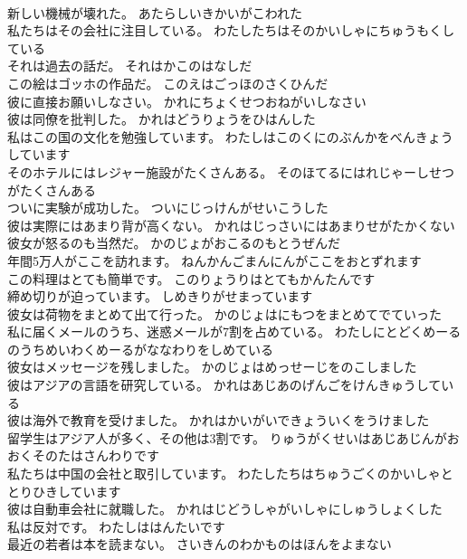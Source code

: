 \documentclass[8pt]{extreport}
\begin{document}
\begin{CJK}{UTF8}{min}
\\	新しい機械が壊れた。	あたらしいきかいがこわれた 
\\	私たちはその会社に注目している。	わたしたちはそのかいしゃにちゅうもくしている 
\\	それは過去の話だ。	それはかこのはなしだ 
\\	この絵はゴッホの作品だ。	このえはごっほのさくひんだ 
\\	彼に直接お願いしなさい。	かれにちょくせつおねがいしなさい 
\\	彼は同僚を批判した。	かれはどうりょうをひはんした 
\\	私はこの国の文化を勉強しています。	わたしはこのくにのぶんかをべんきょうしています 
\\	そのホテルにはレジャー施設がたくさんある。	そのほてるにはれじゃーしせつがたくさんある 
\\	ついに実験が成功した。	ついにじっけんがせいこうした 
\\	彼は実際にはあまり背が高くない。	かれはじっさいにはあまりせがたかくない 
\\	彼女が怒るのも当然だ。	かのじょがおこるのもとうぜんだ 
\\	年間5万人がここを訪れます。	ねんかんごまんにんがここをおとずれます 
\\	この料理はとても簡単です。	このりょうりはとてもかんたんです 
\\	締め切りが迫っています。	しめきりがせまっています 
\\	彼女は荷物をまとめて出て行った。	かのじょはにもつをまとめてでていった 
\\	私に届くメールのうち、迷惑メールが7割を占めている。	わたしにとどくめーるのうちめいわくめーるがななわりをしめている 
\\	彼女はメッセージを残しました。	かのじょはめっせーじをのこしました 
\\	彼はアジアの言語を研究している。	かれはあじあのげんごをけんきゅうしている 
\\	彼は海外で教育を受けました。	かれはかいがいできょういくをうけました 
\\	留学生はアジア人が多く、その他は3割です。	りゅうがくせいはあじあじんがおおくそのたはさんわりです 
\\	私たちは中国の会社と取引しています。	わたしたちはちゅうごくのかいしゃととりひきしています 
\\	彼は自動車会社に就職した。	かれはじどうしゃがいしゃにしゅうしょくした 
\\	私は反対です。	わたしははんたいです 
\\	最近の若者は本を読まない。	さいきんのわかものはほんをよまない 

\end{CJK}
\end{document}
